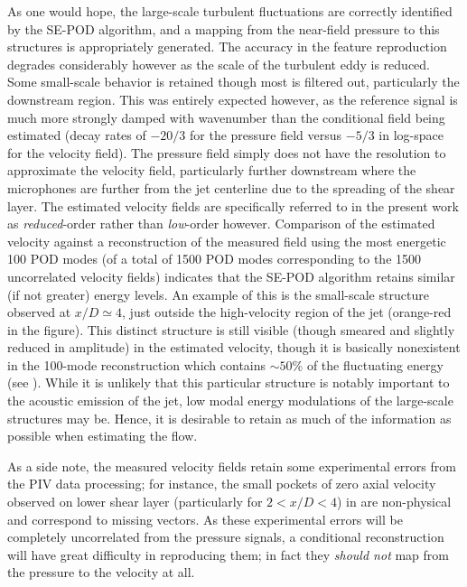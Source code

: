 As one would hope, the large-scale turbulent fluctuations are correctly identified by the SE-POD algorithm, and a mapping from the near-field pressure to this structures is appropriately generated.
The accuracy in the feature reproduction degrades considerably however as the scale of the turbulent eddy is reduced.
Some small-scale behavior is retained though most is filtered out, particularly the downstream region.
This was entirely expected however, as the reference signal is much more strongly damped with wavenumber than the conditional field being estimated (decay rates of $-20/3$ for the pressure field versus $-5/3$ in log-space for the velocity field).
The pressure field simply does not have the resolution to approximate the velocity field, particularly further downstream where the microphones are further from the jet centerline due to the spreading of the shear layer.
The estimated velocity fields are specifically referred to in the present work as \textit{reduced}-order rather than \textit{low}-order however.
Comparison of the estimated velocity against a reconstruction of the measured field using the most energetic 100 POD modes (of a total of 1500 POD modes corresponding to the 1500 uncorrelated velocity fields) indicates that the SE-POD algorithm retains similar (if not greater) energy levels.
An example of this is the small-scale structure observed at $x/D \simeq 4$, just outside the high-velocity region of the jet (orange-red in the figure).
This distinct structure is still visible (though smeared and slightly reduced in amplitude) in the estimated velocity, though it is basically nonexistent in the 100-mode reconstruction which contains $\sim 50$\% of the fluctuating energy (see ).
While it is unlikely that this particular structure is notably important to the acoustic emission of the jet, low modal energy modulations of the large-scale structures may be.
Hence, it is desirable to retain as much of the information as possible when estimating the flow.

As a side note, the measured velocity fields retain some experimental errors from the PIV data processing; for instance, the small pockets of zero axial velocity observed on lower shear layer (particularly for $2 < x/D < 4$) in  are non-physical and correspond to missing vectors. 
As these experimental errors will be completely uncorrelated from the pressure signals, a conditional reconstruction will have great difficulty in reproducing them; in fact they \textit{should not} map from the pressure to the velocity at all.

